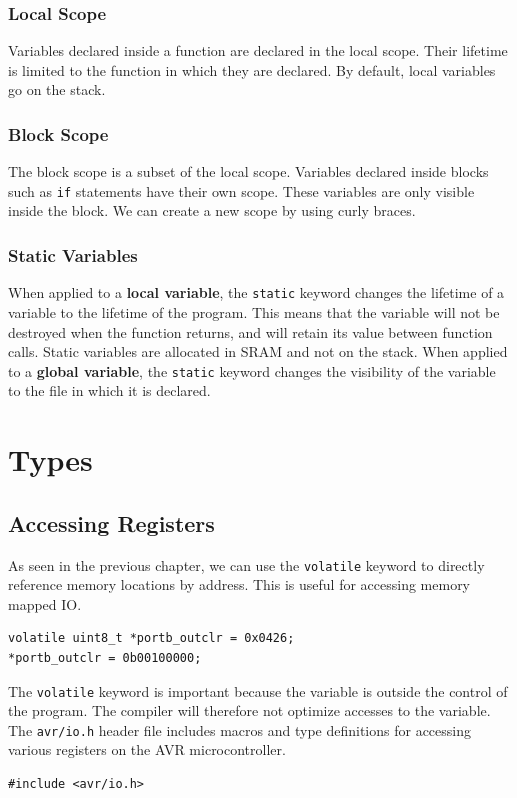 \documentclass{report}
\begin{document}
\subsection{Local Scope}
Variables declared inside a function are declared in the local scope.
Their lifetime is limited to the function in which they are declared.
By default, local variables go on the stack.
\subsection{Block Scope}
The block scope is a subset of the local scope.
Variables declared inside blocks such as \texttt{if} statements
have their own scope. These variables are only visible inside the block.
We can create a new scope by using curly braces.
\subsection{Static Variables}
When applied to a \textbf{local variable}, the \texttt{static} keyword
changes the lifetime of a variable to the lifetime of the program.
This means that the variable will not be destroyed when the function
returns, and will retain its value between function calls.
Static variables are allocated in SRAM and not on the stack.
When applied to a \textbf{global variable}, the \texttt{static} keyword
changes the visibility of the variable to the file in which it is declared.
\chapter{Types}
\section{Accessing Registers}
As seen in the previous chapter, we can use the \texttt{volatile} keyword
to directly reference memory locations by address. This is useful for accessing
memory mapped IO\@.
\begin{verbatim}
volatile uint8_t *portb_outclr = 0x0426;
*portb_outclr = 0b00100000;
\end{verbatim}
The \texttt{volatile} keyword is important because the variable
is outside the control of the program. The compiler will therefore not optimize
accesses to the variable.
The \texttt{avr/io.h}
header file includes macros and type definitions for accessing various
registers on the AVR microcontroller.
\begin{verbatim}
#include <avr/io.h>
\end{verbatim}
\end{document}
